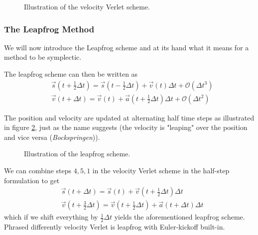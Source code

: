 \begin{figure}[!htb]
  \centering
  \hfill
  \caption{Illustration of the velocity Verlet scheme.}
  \label{fig:vel_verl}
\end{figure}

\subsubsection{The Leapfrog Method}
We will now introduce the Leapfrog scheme and at its hand what it means for a method to be symplectic.

The leapfrog scheme can then be written as
\begin{equation}
\begin{aligned}
& \vec{s}(t + \frac{1}{2} \Delta t)=\vec{s}(t - \frac{1}{2} \Delta t)+ \vec{v}(t) \Delta t + \mathcal{O}(\Delta t^3) \\
& \vec{v}(t + \Delta t)=\vec{v}(t)+ \vec{a}(t + \frac{1}{2} \Delta t) \Delta t  + \mathcal{O}(\Delta t^2)
\end{aligned}
\end{equation}

The position and velocity are updated at alternating half time steps as illustrated in figure \ref{fig:leapfrog},
just as the name suggests (the velocity is "leaping" over the position and vice versa (\textit{Bockspringen})).

\begin{figure}[!htb]
  \centering
  \hfill
  \caption{Illustration of the leapfrog scheme.}
  \label{fig:leapfrog}
\end{figure}


We can combine steps $4,5,1$ in the velocity Verlet scheme in the half-step formulation to get
\begin{equation}
  \begin{aligned}
    & \vec{s}(t + \Delta t) = \vec{s}(t) + \vec{v}\left( t + \frac{1}{2} \Delta t \right) \Delta t \\
    & \vec{v}(t + \frac{3}{2} \Delta t) =\vec{v}(t + \frac{1}{2} \Delta t) + \vec{a}(t + \Delta t) \Delta t
    \end{aligned}
\end{equation}
which if we shift everything by $\frac{1}{2} \Delta t$ yields the aforementioned leapfrog scheme. Phrased differently
velocity Verlet is leapfrog with Euler-kickoff built-in.

